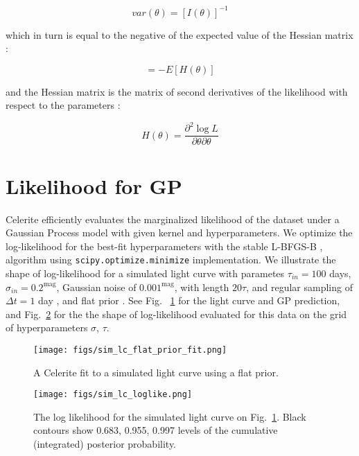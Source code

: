 \documentclass[fleqn,usenatbib]{mnras}  %
\begin{document}
\begin{equation}
var(\theta) = [I(\theta)]^{-1}
\end{equation}

which in turn is equal to the negative of the expected value of the Hessian matrix : 

\begin{equation}
[I(\theta)] = -E[H(\theta)]
\end{equation}

and the Hessian matrix is  the matrix of second derivatives of the likelihood with respect to the parameters : 

\begin{equation}
H(\theta) = \frac{\partial^{2}\log{L}}{\partial \theta \partial \theta }
\end{equation}

\section{Likelihood for GP}
Celerite efficiently evaluates the marginalized likelihood of the dataset under a Gaussian Process model with given kernel and hyperparameters. We optimize the  log-likelihood  for the best-fit hyperparameters with the stable   L-BFGS-B  \citep{lu1995}, \citep{zhu1997}  algorithm   using  \verb|scipy.optimize.minimize| \citep{jones2001} implementation.  We illustrate the shape of log-likelihood for a simulated light curve with parametes  {$\tau_{in}=100$ days, $\sigma_{in} = 0.2^{\mathrm{mag}}$, Gaussian noise of $0.001^{\mathrm{mag}}$, with length $20 \tau$, and regular sampling of $\Delta t = 1 $ day  }, and flat prior . See   Fig. ~\ref{fig:lc_logL_fit}  for the light curve and GP prediction, and Fig.~\ref{fig:lc_logL} for the the shape of log-likelihood evaluated for this data on the grid of hyperparameters $\sigma$, $\tau$. 

\begin{figure}
\texttt{[image: figs/sim\_lc\_flat\_prior\_fit.png]}
\caption{A Celerite fit to a simulated light curve using a flat prior. }
\label{fig:lc_logL_fit}
\end{figure} 

\begin{figure}
\texttt{[image: figs/sim\_lc\_loglike.png]}
\caption{The log likelihood for the simulated light curve on Fig.~\ref{fig:lc_logL_fit}. Black contours show 0.683, 0.955, 0.997 levels of the cumulative (integrated) posterior probability. }
\label{fig:lc_logL}
\end{figure} 
\end{document}
